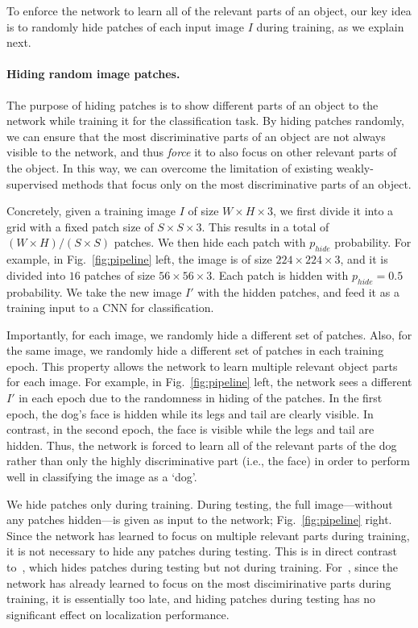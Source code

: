 \documentclass[10pt,twocolumn,letterpaper]{article}
\begin{document}
To enforce the network to learn all of the relevant parts of an object, our key idea is to randomly hide patches of each input image $I$ during training, as we explain next.  

\vspace{-10pt}\paragraph{Hiding random image patches.}

The purpose of hiding patches is to show different parts of an object to the network while training it for the classification task.  By hiding patches randomly, we can ensure that the most discriminative parts of an object are not always visible to the network, and thus \emph{force} it to also focus on other relevant parts of the object.  In this way, we can overcome the limitation of existing weakly-supervised methods that focus only on the most discriminative parts of an object.

Concretely, given a training image $I$ of size $W \times H \times 3$, we first divide it into a grid with a fixed patch size of $S \times S \times 3$.  This results in a total of $(W \times H)/(S \times S)$ patches.  We then hide each patch with $p_{hide}$ probability.  For example, in Fig.~\ref{fig:pipeline} left, the image is of size $224 \times 224 \times 3$, and it is divided into $16$ patches of size $56 \times 56 \times 3$.  Each patch is hidden with $p_{hide}=0.5$ probability.  We take the new image $I'$ with the hidden patches, and feed it as a training input to a CNN for classification.


Importantly, for each image, we randomly hide a different set of patches.  Also, for the same image, we randomly hide a different set of patches in each training epoch.  This property allows the network to learn multiple relevant object parts for each image.  For example, in Fig.~\ref{fig:pipeline} left, the network sees a different $I'$ in each epoch due to the randomness in hiding of the patches. In the first epoch, the dog's face is hidden while its legs and tail are clearly visible.  In contrast, in the second epoch, the face is visible while the legs and tail are hidden.  Thus, the network is forced to learn all of the relevant parts of the dog rather than only the highly discriminative part (i.e., the face) in order to perform well in classifying the image as a `dog'.  

We hide patches only during training.  During testing, the full image---without any patches hidden---is given as input to the network; Fig.~\ref{fig:pipeline} right.  Since the network has learned to focus on multiple relevant parts during training, it is not necessary to hide any patches during testing.  This is in direct contrast to~\cite{bazzani_wacv2016}, which hides patches during testing but not during training.  For~\cite{bazzani_wacv2016}, since the network has already learned to focus on the most discimirinative parts during training, it is essentially too late, and hiding patches during testing has no significant effect on localization performance.
\end{document}

